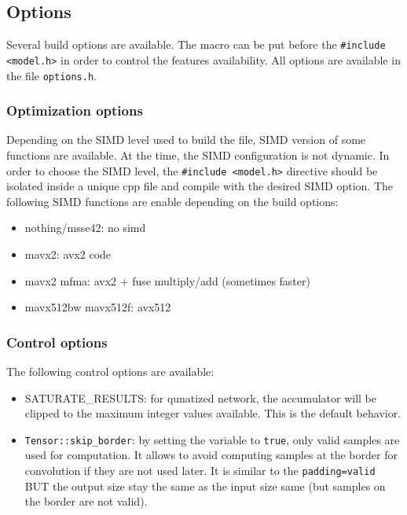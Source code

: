 \documentclass[10pt,a4paper]{article}
\begin{document}
\subsection{Options}
Several build options are available. The macro can be put before the \texttt{\#include <model.h>} in order to control the features availability. All options are available in the file  \texttt{options.h}.

\subsubsection{Optimization options}
Depending on the SIMD level used to build the file, SIMD version of some functions are available.
At the time, the SIMD configuration is not dynamic. In order to choose the SIMD level, the \texttt{\#include <model.h>} directive should be isolated inside a unique cpp file and compile with the desired SIMD option.
The following SIMD functions are enable depending on the build options:
\begin{itemize}
\item nothing/\-msse42: no simd
\item \-mavx2:  avx2 code
\item \-mavx2 \-mfma: avx2 + fuse multiply/add (sometimes faster)
\item \-mavx512bw \-mavx512f: avx512
\end{itemize}

\subsubsection{Control options}
The following control options are available:
\begin{itemize}
\item  \textrm{SATURATE\_RESULTS}: for qunatized network, the accumulator will be clipped to the maximum integer values available. This is the default behavior.
\item \texttt{Tensor::skip\_border}: by setting the variable to \texttt{true}, only valid samples are used for computation. It allows to avoid computing samples at the border for convolution if they are not used later. It is similar to the \texttt{padding=valid} BUT the output size stay the same as the input size same (but samples on the border are not valid).
\end{itemize}
\end{document}
